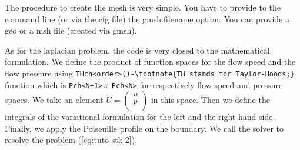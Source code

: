 The procedure to create the mesh is very simple.
You have to provide to the command line (or via the cfg file) the gmsh.filename option.
You can provide a geo or a msh file (created via gmsh).

As for the laplacian problem, the code is very closed to the mathematical formulation.
We define the product of function spaces for the flow speed and the flow pressure
using \lstinline!THch<order>()~\footnote{TH stands for Taylor-Hoods;}! function which is \lstinline!Pch<N+1>!$\times$ \lstinline!Pch<N>!
for respectively flow speed and pressure spaces.
We take an element 
$U=\left(
    \begin{array}{c}
        u \\
        p \\
    \end{array}
\right)
$
in this space. Then we define the integrals of the variational formulation
for the left and the right hand side. Finally, we apply the Poiseuille profile on the boundary.
We call the solver to resolve the problem (\ref{eq:tuto-stk-2}).



